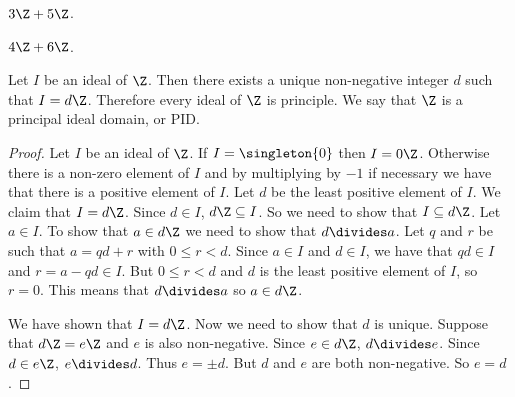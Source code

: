 \documentclass[oneside,12pt]{amsart}
\begin{document}
\begin{in_class_example}
$3\Z + 5\Z$.

$4\Z + 6\Z$.
\end{in_class_example}

\begin{theorem}[$\Z$ is a PID]
\label{ZIsAPID}
Let $I$ be an ideal of $\Z$. Then there exists a unique non-negative integer
 $d$
such that $I=d\Z$.
Therefore every ideal of $\Z$ is principle. We say that $\Z$ is a principal ideal domain,
or PID.
\end{theorem}
\begin{proof}
Let $I$ be an ideal of $\Z$. If $I=\singleton{0}$ then $I=0\Z$. Otherwise
there is a non-zero element of $I$ and by multiplying by $-1$ if necessary
we have that there is a positive element of $I$. Let $d$ be the least positive
element of $I$. We claim that $I=d\Z$. Since $d\in I$, $d\Z\subseteq I$.
So we need to show that $I\subseteq d\Z$. Let $a\in I$. To show that $a\in d\Z$
we need to show that $d\divides a$. Let $q$ and $r$ be such that
$a=qd+r$ with $0\leq r < d$. Since $a\in I$ and $d\in I$, we have that
$qd\in I$ and $r=a-qd\in I$. But $0\leq r<d$ and $d$ is the least positive element
of $I$, so $r=0$. This means that $d \divides a$ so $a\in d\Z$.

We have shown that $I=d\Z$. Now we need to show that $d$ is unique. Suppose
that $d\Z=e\Z$ and $e$ is also non-negative. Since
$e\in d\Z$, $d\divides e$. Since $d\in e\Z$, $e\divides d$.
Thus $e = \pm d$. But $d$ and $e$ are both non-negative. So
$e=d$.
\end{proof}




\end{document}
